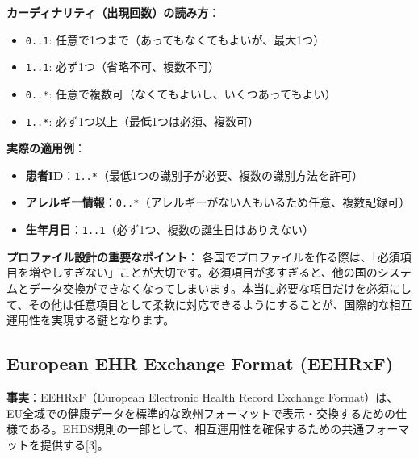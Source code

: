 \documentclass[
  a4paper,
  a4paper,
  11pt]{ltjsbook}
\providecommand{\tightlist}{%
  \setlength{\itemsep}{0pt}\setlength{\parskip}{0pt}}
\begin{document}
\textbf{カーディナリティ（出現回数）の読み方}：

\begin{itemize}
\tightlist
\item
  \texttt{0..1}: 任意で1つまで（あってもなくてもよいが、最大1つ）
\item
  \texttt{1..1}: 必ず1つ（省略不可、複数不可）
\item
  \texttt{0..*}: 任意で複数可（なくてもよいし、いくつあってもよい）
\item
  \texttt{1..*}: 必ず1つ以上（最低1つは必須、複数可）
\end{itemize}

\textbf{実際の適用例}：

\begin{itemize}
\tightlist
\item
  \textbf{患者ID}：\texttt{1..*}（最低1つの識別子が必要、複数の識別方法を許可）
\item
  \textbf{アレルギー情報}：\texttt{0..*}（アレルギーがない人もいるため任意、複数記録可）
\item
  \textbf{生年月日}：\texttt{1..1}（必ず1つ、複数の誕生日はありえない）
\end{itemize}

\begin{tcolorbox}[enhanced jigsaw, toprule=.15mm, bottomtitle=1mm, coltitle=black, left=2mm, opacityback=0, arc=.35mm, colbacktitle=quarto-callout-important-color!10!white, colback=white, opacitybacktitle=0.6, bottomrule=.15mm, rightrule=.15mm, breakable, title=\textcolor{quarto-callout-important-color}{\faExclamation}\hspace{0.5em}{Important}, toptitle=1mm, titlerule=0mm, colframe=quarto-callout-important-color-frame, leftrule=.75mm]

\textbf{プロファイル設計の重要なポイント}：
各国でプロファイルを作る際は、「必須項目を増やしすぎない」ことが大切です。必須項目が多すぎると、他の国のシステムとデータ交換ができなくなってしまいます。本当に必要な項目だけを必須にして、その他は任意項目として柔軟に対応できるようにすることが、国際的な相互運用性を実現する鍵となります。

\end{tcolorbox}

\subsection{European EHR Exchange Format
(EEHRxF)}\label{european-ehr-exchange-format-eehrxf}

\textbf{事実}：EEHRxF（European Electronic Health Record Exchange
Format）は、EU全域での健康データを標準的な欧州フォーマットで表示・交換するための仕様である。EHDS規則の一部として、相互運用性を確保するための共通フォーマットを提供する{[}3{]}。
\end{document}
